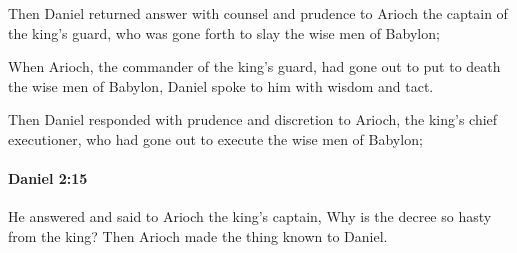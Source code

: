 			\begin{versebox}
					\item[BHS] 
					\item[LXX] 
					\item[ASV] Then Daniel returned answer with counsel and prudence to Arioch the captain of the king's guard, who was gone forth to slay the wise men of Babylon;
					\item[NIV] When Arioch, the commander of the king’s guard, had gone out to put to death the wise men of Babylon, Daniel spoke to him with wisdom and tact.
					\item[NRSV] Then Daniel responded with prudence and discretion to Arioch, the king’s chief executioner, who had gone out to execute the wise men of Babylon;
			\end{versebox}

		\paragraph{Daniel 2:15} %
			\label{DANIEL-2-15}

			He answered and said to Arioch the king’s captain, Why is the decree so hasty from the king? Then Arioch made the thing known to Daniel.


